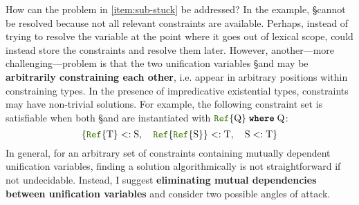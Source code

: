 How can the problem in \ref{item:sub-stuck} be addressed?
In the example, \S cannot be resolved because not all relevant constraints
are available. Perhaps, instead of trying to resolve the variable at the point 
where it goes out of lexical scope, \algo could instead 
store the constraints and resolve them later.
However, another---more challenging---problem is that the two unification
variables \S and \T may be \textbf{arbitrarily constraining each other},
i.e. appear in arbitrary positions within constraining types. In the presence of
impredicative existential types, constraints may have non-trivial solutions.
For example, the following constraint set is satisfiable when both
\S and \T are instantiated with $\wheret{\reftyp{\Q}}{\Q}$:
\[
  \{ \reftyp{\T} <: \S, \quad \reftyp{\reftyp{\S}} <: \T, \quad \S <: \T \}
\]
In general, for an arbitrary set of constraints containing mutually
dependent unification variables, finding a solution algorithmically is
not straightforward if not undecidable.
%
%
Instead, I suggest \textbf{eliminating mutual dependencies
between unification variables}
and consider two possible angles of attack.
